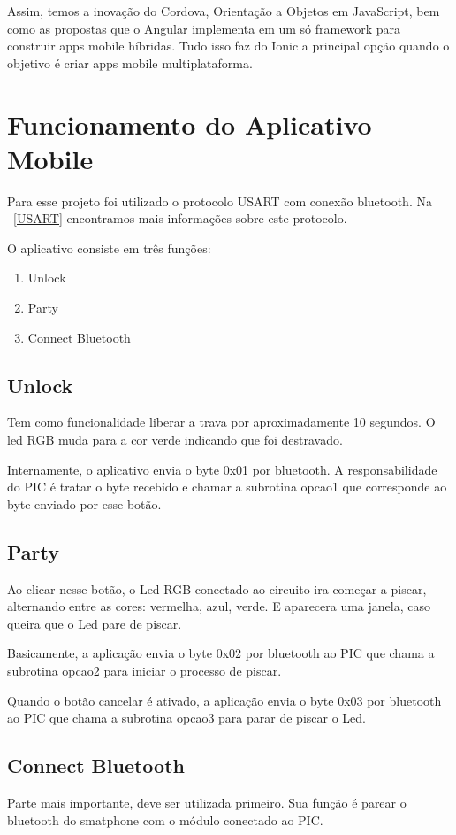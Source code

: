 \documentclass[
	article,			%
	12pt,				%
	oneside,			%
	a4paper,            %
	twocolumn,
	english,			%
	brazil,				%
	sumario=tradicional
	]{abntex2}
\begin{document}
Assim, temos a inovação do Cordova, Orientação a Objetos em JavaScript, bem como as propostas que o Angular implementa em um só framework para construir apps mobile híbridas. Tudo isso faz do Ionic a principal opção quando o objetivo é criar apps mobile multiplataforma.


\section{Funcionamento do Aplicativo Mobile}

Para esse projeto foi utilizado o protocolo USART com conexão bluetooth. Na ~\autoref{USART} encontramos mais informações sobre este protocolo. 

O aplicativo consiste em três funções: 
\begin{enumerate}
    \item Unlock
    \item Party
    \item Connect Bluetooth
\end{enumerate}

\subsection{Unlock}
    Tem como funcionalidade liberar a trava por aproximadamente 10 segundos. O led
RGB muda para a cor verde indicando que foi destravado.

Internamente, o aplicativo envia o byte 0x01 por bluetooth. A responsabilidade do PIC é tratar o byte recebido e chamar a subrotina opcao1 que corresponde ao byte enviado por esse botão.

\subsection{Party}
Ao clicar nesse botão, o Led RGB conectado ao circuito ira começar a piscar, alternando entre as cores: vermelha, azul, verde. E aparecera uma janela, caso queira que o Led pare de piscar.

Basicamente, a aplicação envia o byte 0x02 por bluetooth ao PIC que chama a subrotina opcao2 para iniciar o processo de piscar.

Quando o botão cancelar é ativado, a aplicação envia o byte 0x03 por bluetooth ao PIC que chama a subrotina opcao3 para parar de piscar o Led.
    
\subsection{Connect Bluetooth}
Parte mais importante, deve ser utilizada primeiro. Sua função é parear o bluetooth do smatphone com o módulo conectado ao PIC.
\end{document}
